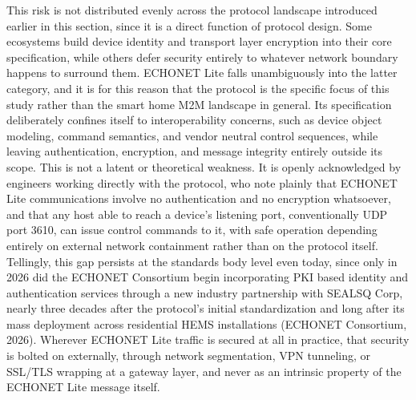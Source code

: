 This risk is not distributed evenly across the protocol landscape introduced earlier in this section, since it is a direct function of protocol design. Some ecosystems build device identity and transport layer encryption into their core specification, while others defer security entirely to whatever network boundary happens to surround them. ECHONET Lite falls unambiguously into the latter category, and it is for this reason that the protocol is the specific focus of this study rather than the smart home M2M landscape in general. Its specification deliberately confines itself to interoperability concerns, such as device object modeling, command semantics, and vendor neutral control sequences, while leaving authentication, encryption, and message integrity entirely outside its scope. This is not a latent or theoretical weakness. It is openly acknowledged by engineers working directly with the protocol, who note plainly that ECHONET Lite communications involve no authentication and no encryption whatsoever, and that any host able to reach a device's listening port, conventionally UDP port 3610, can issue control commands to it, with safe operation depending entirely on external network containment rather than on the protocol itself. Tellingly, this gap persists at the standards body level even today, since only in 2026 did the ECHONET Consortium begin incorporating PKI based identity and authentication services through a new industry partnership with SEALSQ Corp, nearly three decades after the protocol's initial standardization and long after its mass deployment across residential HEMS installations (ECHONET Consortium, 2026). Wherever ECHONET Lite traffic is secured at all in practice, that security is bolted on externally, through network segmentation, VPN tunneling, or SSL/TLS wrapping at a gateway layer, and never as an intrinsic property of the ECHONET Lite message itself.
